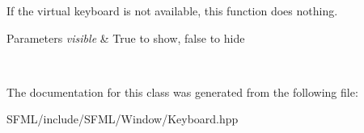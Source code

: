 If the virtual keyboard is not available, this function does nothing.


\begin{DoxyParams}{Parameters}
{\em visible} & True to show, false to hide \begin{DoxyVerb}\end{DoxyVerb}
 \\
\hline
\end{DoxyParams}


The documentation for this class was generated from the following file\+:\begin{DoxyCompactItemize}
\item 
S\+F\+M\+L/include/\+S\+F\+M\+L/\+Window/Keyboard.\+hpp\end{DoxyCompactItemize}
